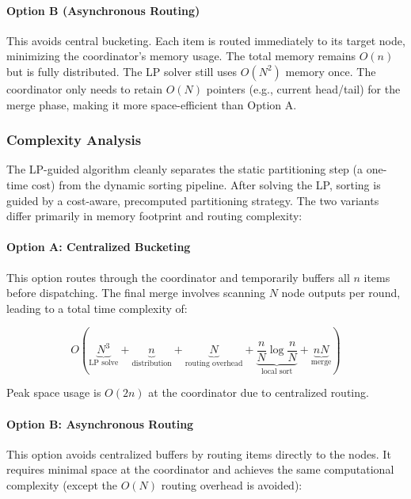 \documentclass[]{interact}
\theoremstyle{plain}
\theoremstyle{definition}
\theoremstyle{remark}
\begin{document}
\paragraph{Option B (Asynchronous Routing)}
This avoids central bucketing. Each item is routed immediately to its target node, minimizing the coordinator’s memory usage. The total memory remains $O(n)$ but is fully distributed. The LP solver still uses $O(N^2)$ memory once. The coordinator only needs to retain $O(N)$ pointers (e.g., current head/tail) for the merge phase, making it more space-efficient than Option A.

\subsubsection{Complexity Analysis}
The LP-guided algorithm cleanly separates the static partitioning step (a one-time cost) from the dynamic sorting pipeline. After solving the LP, sorting is guided by a cost-aware, precomputed partitioning strategy. The two variants differ primarily in memory footprint and routing complexity:

\paragraph{Option A: Centralized Bucketing}
This option routes through the coordinator and temporarily buffers all $n$ items before dispatching. The final merge involves scanning $N$ node outputs per round, leading to a total time complexity of:

\begin{equation}
    O\left( 
        \underbrace{N^3}_{\text{LP solve}} 
        + \underbrace{n}_{\text{distribution}} 
        + \underbrace{N}_{\text{routing overhead}} 
        + \underbrace{\frac{n}{N} \log \frac{n}{N}}_{\text{local sort}} 
        + \underbrace{nN}_{\text{merge}}
    \right)
\end{equation}

Peak space usage is $O(2n)$ at the coordinator due to centralized routing.

\paragraph{Option B: Asynchronous Routing}
This option avoids centralized buffers by routing items directly to the nodes. It requires minimal space at the coordinator and achieves the same computational complexity (except the $O(N)$ routing overhead is avoided):
\end{document}
